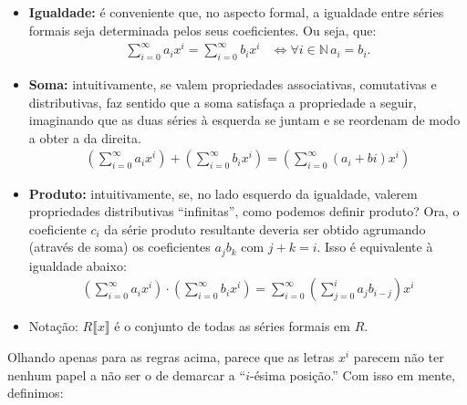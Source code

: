 \begin{itemize}
    \item \textbf{Igualdade:} é conveniente que, no aspecto formal, a igualdade entre séries formais seja determinada pelos seus coeficientes. Ou seja, que:
    \begin{align*}
      \sum_{i=0}^\infty a_ix^i=\sum_{i=0}^\infty b_ix^i & \Leftrightarrow \forall i\in \mathbb N\, a_i= b_i.
    \end{align*}
    \item \textbf{Soma:} intuitivamente, se valem propriedades associativas, comutativas e distributivas, faz sentido que a soma satisfaça a propriedade a seguir, imaginando que as duas séries à esquerda se juntam e se reordenam de modo a obter a da direita.
    \begin{align*}
        \left(\sum_{i=0}^\infty a_ix^i\right)+\left(\sum_{i=0}^\infty b_ix^i\right)=\left(\sum_{i=0}^\infty (a_i+bi)x^i\right)
    \end{align*}
    \item \textbf{Produto:} intuitivamente, se, no lado esquerdo da igualdade, valerem propriedades distributivas ``infinitas'', como podemos definir produto? Ora, o coeficiente $c_i$ da série produto resultante deveria ser obtido agrumando (através de soma) os coeficientes $a_jb_k$ com $j+k=i$. Isso é equivalente à igualdade abaixo:
    \begin{align*}
        \left(\sum_{i=0}^\infty a_ix^i\right)\cdot\left(\sum_{i=0}^\infty b_ix^i\right)=\sum_{i=0}^\infty \left(\sum_{j=0}^i a_{j}b_{i-j}\right)x^i
    \end{align*}
    \item Notação: $R\llbracket x \rrbracket$ é o conjunto de todas as séries formais em $R$.
\end{itemize}
Olhando apenas para as regras acima, parece que as letras $x^i$ parecem não ter nenhum papel a não ser o de demarcar a ``$i$-ésima posição.'' Com isso em mente, definimos:
